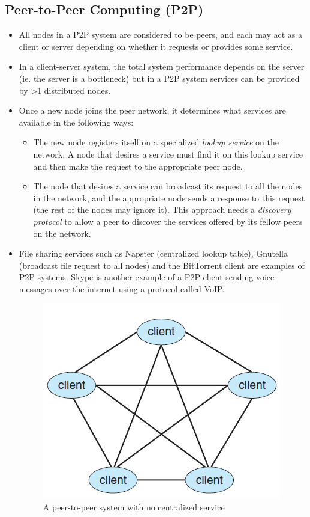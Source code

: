 \documentclass{article}
\theoremstyle{plain}
\theoremstyle{definition}
\begin{document}
\subsection{Peer-to-Peer Computing (P2P)}
\begin{itemize}
    \item All nodes in a P2P system are considered to be peers, and each may act as a client or server depending on whether it requests or provides some service.
    
    \item In a client-server system, the total system performance depends on the server (ie. the server is a bottleneck) but in a P2P system services can be provided by >1 distributed nodes. 
    
    \item Once a new node joins the peer network, it determines what services are available in the following ways:
    \begin{itemize}
        \item The new node registers itself on a specialized \textit{lookup service} on the network. A node that desires a service must find it on this lookup service and then make the request to the appropriate peer node. 
        
        \item The node that desires a service can broadcast its request to all the nodes in the network, and the appropriate node sends a response to this request (the rest of the nodes may ignore it). This approach needs a \textit{discovery protocol} to allow a peer to discover the services offered by its fellow peers on the network. 
    \end{itemize}
    
    \item File sharing services such as Napster (centralized lookup table), Gnutella (broadcast file request to all nodes) and the BitTorrent client are examples of P2P systems. Skype is another example of a P2P client sending voice messages over the internet using a protocol called VoIP.
    
    \begin{figure}[h]
        \centering
        \includegraphics[scale=0.6]{os8.png}
        \caption{A peer-to-peer system with no centralized service}
        \label{fig:my_label_8}
    \end{figure}
\end{itemize}
\end{document}
